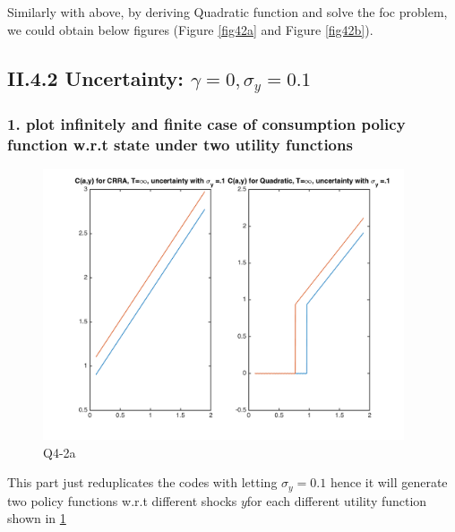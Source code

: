 \documentclass{article}[a4paper]
\begin{document}
Similarly with above, by deriving Quadratic function and solve the foc problem, we could obtain below figures (Figure \ref{fig42a} and Figure \ref{fig42b}). 
\pagebreak

\subsection{II.4.2 Uncertainty: $\gamma=0, \sigma_y = 0.1 $}

\subsubsection{1. plot infinitely and finite case of consumption policy function w.r.t state under two utility functions}

\begin{figure}[htbp]
\centering
\includegraphics[width=\textwidth,height=8cm]{img/421a.png}
\caption{Q4-2a}\label{fig421a}
\end{figure}

This part just reduplicates the codes with letting $\sigma_y = 0.1$ hence it will generate two  policy functions w.r.t different shocks $y$for each different utility function shown in \ref{fig421a}
\end{document}
